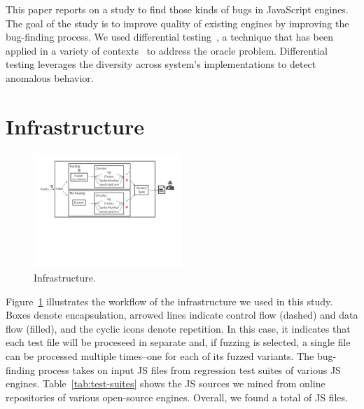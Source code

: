 \documentclass[10pt,conference,anonymous]{IEEEtran}
\begin{document}
This paper reports on a study to find those kinds of bugs in
JavaScript engines. The goal of the study is to improve quality of
existing \js{} engines by improving the bug-finding process. We used
differential testing~\cite{Brumley-etal-ss07}, a technique that has
been applied in a variety of
contexts~\cite{Yang-etal-pldi11,Chen-etal-fse2015,Argyros-etla-ccs16,Chen-etal-pldi16,petsios-etal-sp2017,SivakornAPKJ17}
to address the oracle problem. Differential testing leverages the
diversity across system's implementations to detect anomalous
behavior. 

\section{Infrastructure}
\label{sec:design}


\begin{figure}[t]
  \centering
  \includegraphics[trim=0 250 0 0,clip,width=0.5\textwidth]{google-awards-workflow}  
  \caption{\label{fig:workflow}Infrastructure.}
\end{figure}

Figure~\ref{fig:workflow} illustrates the workflow of the
infrastructure we used in this study. Boxes denote encapsulation,
arrowed lines indicate control flow (dashed) and data flow (filled),
and the cyclic icons denote repetition. In this case, it indicates
that each test file will be proceseed in separate and, if fuzzing is
selected, a single file can be processed multiple times--one for each
of its fuzzed variants. The bug-finding process takes on input JS
files from regression test suites of various JS
engines. Table~\ref{tab:test-suites} shows the JS sources we mined
from online repositories of various open-source engines. Overall, we
found a total of  JS files.
\end{document}
